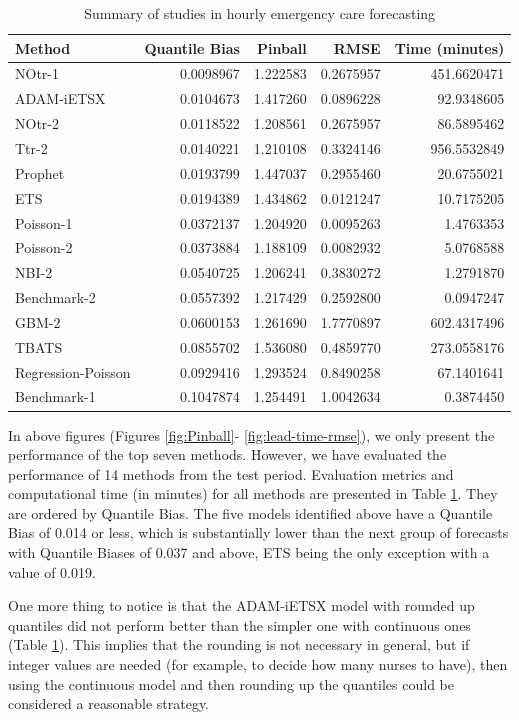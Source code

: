 \documentclass[]{elsarticle} %
\begin{document}
\begin{table}[!h]

\caption{\label{tab:tab-results}Summary of studies in hourly emergency care forecasting}
\centering
\fontsize{9}{11}\selectfont
\begin{tabular}[t]{lrrrr}
\toprule
Method & Quantile Bias & Pinball & RMSE & Time (minutes)\\
\midrule
NOtr-1 & 0.0098967 & 1.222583 & 0.2675957 & 451.6620471\\
ADAM-iETSX & 0.0104673 & 1.417260 & 0.0896228 & 92.9348605\\
NOtr-2 & 0.0118522 & 1.208561 & 0.2675957 & 86.5895462\\
Ttr-2 & 0.0140221 & 1.210108 & 0.3324146 & 956.5532849\\
Prophet & 0.0193799 & 1.447037 & 0.2955460 & 20.6755021\\
ETS & 0.0194389 & 1.434862 & 0.0121247 & 10.7175205\\
Poisson-1 & 0.0372137 & 1.204920 & 0.0095263 & 1.4763353\\
Poisson-2 & 0.0373884 & 1.188109 & 0.0082932 & 5.0768588\\
NBI-2 & 0.0540725 & 1.206241 & 0.3830272 & 1.2791870\\
Benchmark-2 & 0.0557392 & 1.217429 & 0.2592800 & 0.0947247\\
GBM-2 & 0.0600153 & 1.261690 & 1.7770897 & 602.4317496\\
TBATS & 0.0855702 & 1.536080 & 0.4859770 & 273.0558176\\
Regression-Poisson & 0.0929416 & 1.293524 & 0.8490258 & 67.1401641\\
Benchmark-1 & 0.1047874 & 1.254491 & 1.0042634 & 0.3874450\\
\bottomrule
\end{tabular}
\end{table}

In above figures (Figures \ref{fig:Pinball}-
\ref{fig:lead-time-rmse}), we only present the performance of the top
seven methods. However, we have evaluated the performance of 14 methods
from the test period. Evaluation metrics and computational time (in
minutes) for all methods are presented in Table \ref{tab:tab-results}.
They are ordered by Quantile Bias. The five models identified above have
a Quantile Bias of 0.014 or less, which is substantially lower than the
next group of forecasts with Quantile Biases of 0.037 and above, ETS
being the only exception with a value of 0.019.

One more thing to notice is that the ADAM-iETSX model with rounded up
quantiles did not perform better than the simpler one with continuous
ones (Table \ref{tab:tab-results}). This implies that the rounding is
not necessary in general, but if integer values are needed (for example,
to decide how many nurses to have), then using the continuous model and
then rounding up the quantiles could be considered a reasonable
strategy.
\end{document}
